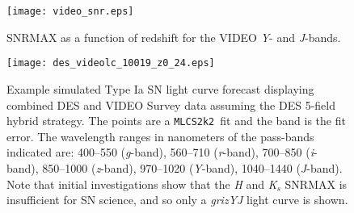 \documentclass[preprint2]{aastex}    %
\newcommand{\mlcs}{{\tt MLCS2k2}}
\begin{document}
\begin{figure}[ht]
\centerline{\texttt{[image: video\_snr.eps]}}
\caption{SNRMAX as a function of redshift for the VIDEO \emph{Y}- and 
\emph{J}-bands.}
\label{fig:video_snr}
\end{figure}

\onecolumn
\begin{figure}[ht]
\centerline{\texttt{[image: des\_videolc\_10019\_z0\_24.eps]}}
\caption{Example simulated Type Ia SN light curve forecast displaying
combined DES and VIDEO Survey data assuming the
DES 5-field hybrid strategy. The points are a \mlcs\ fit and the band is the fit error. The wavelength
ranges in nanometers of the pass-bands indicated are: 400--550
(\emph{g}-band), 560--710 (\emph{r}-band), 700--850 (\emph{i}-band),
850--1000 (\emph{z}-band), 970--1020 (\emph{Y}-band), 1040--1440
(\emph{J}-band). Note that initial 
investigations show that the \emph{H} and
\emph{K}$_s$ SNRMAX is insufficient for SN science, and so only
a \emph{grizYJ} light curve is shown.}
\label{fig:des_video_simlc}
\end{figure}
\twocolumn
\end{document}
